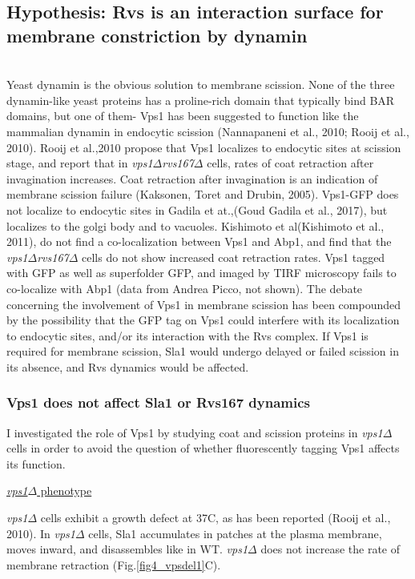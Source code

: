 \subsection{Hypothesis: Rvs is an interaction surface for membrane constriction by dynamin }
	\mbox{}\\
Yeast dynamin is the obvious solution to membrane scission. None of the three dynamin-like yeast proteins has a proline-rich domain that typically bind BAR domains, but one of them- Vps1 has been suggested to function like the mammalian dynamin in endocytic scission (Nannapaneni et al., 2010; Rooij et al., 2010). Rooij et al.,2010 propose that Vps1 localizes to endocytic sites at scission stage, and report that in \textit{vps1$\Delta$}\textit{rvs167$\Delta$} cells, rates of coat retraction after invagination increases. Coat retraction after invagination is an indication of membrane scission failure (Kaksonen, Toret and Drubin, 2005). Vps1-GFP does not localize to endocytic sites in Gadila et at.,(Goud Gadila et al., 2017), but localizes to the golgi body and to vacuoles. Kishimoto et al(Kishimoto et al., 2011), do not find a co-localization between Vps1 and Abp1, and find that the \textit{vps1$\Delta$}\textit{rvs167$\Delta$} cells do not show increased coat retraction rates. Vps1 tagged with GFP as well as superfolder GFP, and imaged by TIRF microscopy fails to co-localize with Abp1 (data from Andrea Picco, not shown). The debate concerning the involvement of Vps1 in membrane scission has been compounded by the possibility that the GFP tag on Vps1 could interfere with its localization to endocytic sites, and/or its interaction with the Rvs complex. If Vps1 is required for membrane scission, Sla1 would undergo delayed or failed scission in its absence, and Rvs dynamics would be affected. 



			\subsubsection{Vps1 does not affect Sla1 or Rvs167 dynamics }
I investigated the role of Vps1 by studying coat and scission proteins in \textit{vps1$\Delta$} cells in order to avoid the question of whether fluorescently tagging Vps1 affects its function. 
\vspace{5mm}

\underline{\textit{vps1$\Delta$} phenotype}

\textit{vps1$\Delta$} cells exhibit a growth defect at 37C, as has been reported (Rooij et al., 2010). In \textit{vps1$\Delta$} cells, Sla1 accumulates in patches at the plasma membrane, moves inward, and disassembles like in WT. \textit{vps1$\Delta$} does not increase the rate of membrane retraction  (Fig.\ref{fig4_vpsdel1}C). 

